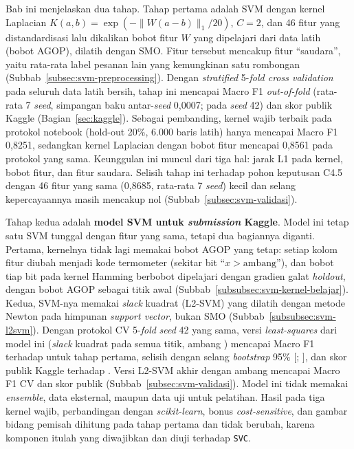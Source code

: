 Bab ini menjelaskan dua tahap. Tahap pertama adalah SVM dengan kernel Laplacian $K(a, b) = \exp(-\lVert W(a-b)\rVert_1 / 20)$, $C = 2$, dan 46 fitur yang distandardisasi lalu dikalikan bobot fitur $W$ yang dipelajari dari data latih (bobot AGOP), dilatih dengan SMO. Fitur tersebut mencakup fitur ``saudara'', yaitu rata-rata label pesanan lain yang kemungkinan satu rombongan (Subbab~\ref{subsec:svm-preprocessing}). Dengan \textit{stratified} 5-\textit{fold cross validation} pada seluruh data latih bersih, tahap ini mencapai Macro F1 \textit{out-of-fold} \SVMLamaCVTujuhSeed{} (rata-rata 7 \textit{seed}, simpangan baku antar-\textit{seed} 0,0007; \SVMLamaCV{} pada \textit{seed} 42) dan skor publik Kaggle \SVMLamaPublik{} (Bagian~\ref{sec:kaggle}). Sebagai pembanding, kernel wajib terbaik pada protokol notebook (hold-out 20\%, 6.000 baris latih) hanya mencapai Macro F1 0,8251, sedangkan kernel Laplacian dengan bobot fitur mencapai 0,8561 pada protokol yang sama. Keunggulan ini muncul dari tiga hal: jarak L1 pada kernel, bobot fitur, dan fitur saudara. Selisih tahap ini terhadap pohon keputusan C4.5 dengan 46 fitur yang sama (0,8685, rata-rata 7 \textit{seed}) kecil dan selang kepercayaannya masih mencakup nol (Subbab~\ref{subsec:svm-validasi}).

Tahap kedua adalah \textbf{model SVM untuk \textit{submission} Kaggle}. Model ini tetap satu SVM tunggal dengan fitur yang sama, tetapi dua bagiannya diganti. Pertama, kernelnya tidak lagi memakai bobot AGOP yang tetap: setiap kolom fitur diubah menjadi kode termometer (sekitar \SVMBaruJumlahBit{} bit ``$x > \text{ambang}$''), dan bobot tiap bit pada kernel Hamming berbobot dipelajari dengan gradien galat \textit{holdout}, dengan bobot AGOP sebagai titik awal (Subbab~\ref{subsubsec:svm-kernel-belajar}). Kedua, SVM-nya memakai \textit{slack} kuadrat (L2-SVM) yang dilatih dengan metode Newton pada himpunan \textit{support vector}, bukan SMO (Subbab~\ref{subsubsec:svm-l2svm}). Dengan protokol CV 5-\textit{fold} \textit{seed} 42 yang sama, versi \textit{least-squares} dari model ini (\textit{slack} kuadrat pada semua titik, ambang \SVMLSAmbang{}) mencapai Macro F1 \SVMLSCV{} terhadap \SVMLamaCV{} untuk tahap pertama, selisih \SVMLSSelisih{} dengan selang \textit{bootstrap} 95\% $[$\SVMLSSelisihBawah{}; \SVMLSSelisihAtas{}$]$, dan skor publik Kaggle \SVMLSPublik{} terhadap \SVMLamaPublik{}. Versi L2-SVM akhir dengan ambang \SVMBaruAmbang{} mencapai Macro F1 CV \SVMBaruCV{} dan skor publik \SVMBaruPublik{} (Subbab~\ref{subsec:svm-validasi}). Model ini tidak memakai \textit{ensemble}, data eksternal, maupun data uji untuk pelatihan. Hasil pada tiga kernel wajib, perbandingan dengan \textit{scikit-learn}, bonus \textit{cost-sensitive}, dan gambar bidang pemisah dihitung pada tahap pertama dan tidak berubah, karena komponen itulah yang diwajibkan dan diuji terhadap \texttt{SVC}.






